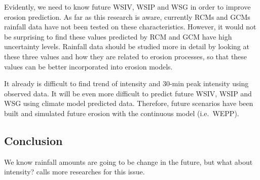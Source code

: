 
Evidently, we need to know future WSIV, WSIP and WSG in order to improve erosion
prediction. As far as this research is aware, currently RCMs and GCMs rainfall
data have not been tested on these characteristics. However, it would not be
surprising to find these values predicted by RCM and GCM have high uncertainty
levels. Rainfall data should be studied more in detail by looking at these three
values and how they are related to erosion processes, so that these values can
be better incorporated into erosion models.

It already is difficult to find trend of intensity and 30-min peak intensity
using observed data. It will be even more difficult to predict future WSIV, WSIP
and WSG using climate model predicted data. Therefore, future scenarios have
been
built and simulated future erosion with the continuous model (i.e.\ WEPP).



%
%
%
%
%

\subsection{Conclusion}
\label{sec:ObservedRainfallIntensityTrendsConclusion}
We know rainfall amounts are going to be change in the future, but what about
intensity? \citet{trenberth2003-1205} calls more researches for this issue.

